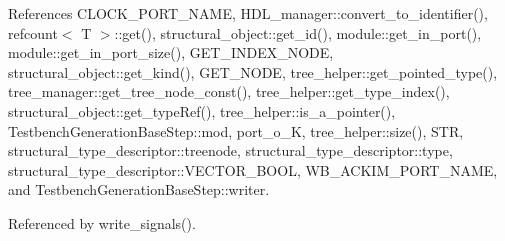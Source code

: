 References C\+L\+O\+C\+K\+\_\+\+P\+O\+R\+T\+\_\+\+N\+A\+ME, H\+D\+L\+\_\+manager\+::convert\+\_\+to\+\_\+identifier(), refcount$<$ T $>$\+::get(), structural\+\_\+object\+::get\+\_\+id(), module\+::get\+\_\+in\+\_\+port(), module\+::get\+\_\+in\+\_\+port\+\_\+size(), G\+E\+T\+\_\+\+I\+N\+D\+E\+X\+\_\+\+N\+O\+DE, structural\+\_\+object\+::get\+\_\+kind(), G\+E\+T\+\_\+\+N\+O\+DE, tree\+\_\+helper\+::get\+\_\+pointed\+\_\+type(), tree\+\_\+manager\+::get\+\_\+tree\+\_\+node\+\_\+const(), tree\+\_\+helper\+::get\+\_\+type\+\_\+index(), structural\+\_\+object\+::get\+\_\+type\+Ref(), tree\+\_\+helper\+::is\+\_\+a\+\_\+pointer(), Testbench\+Generation\+Base\+Step\+::mod, port\+\_\+o\+\_\+K, tree\+\_\+helper\+::size(), S\+TR, structural\+\_\+type\+\_\+descriptor\+::treenode, structural\+\_\+type\+\_\+descriptor\+::type, structural\+\_\+type\+\_\+descriptor\+::\+V\+E\+C\+T\+O\+R\+\_\+\+B\+O\+OL, W\+B\+\_\+\+A\+C\+K\+I\+M\+\_\+\+P\+O\+R\+T\+\_\+\+N\+A\+ME, and Testbench\+Generation\+Base\+Step\+::writer.



Referenced by write\+\_\+signals().

